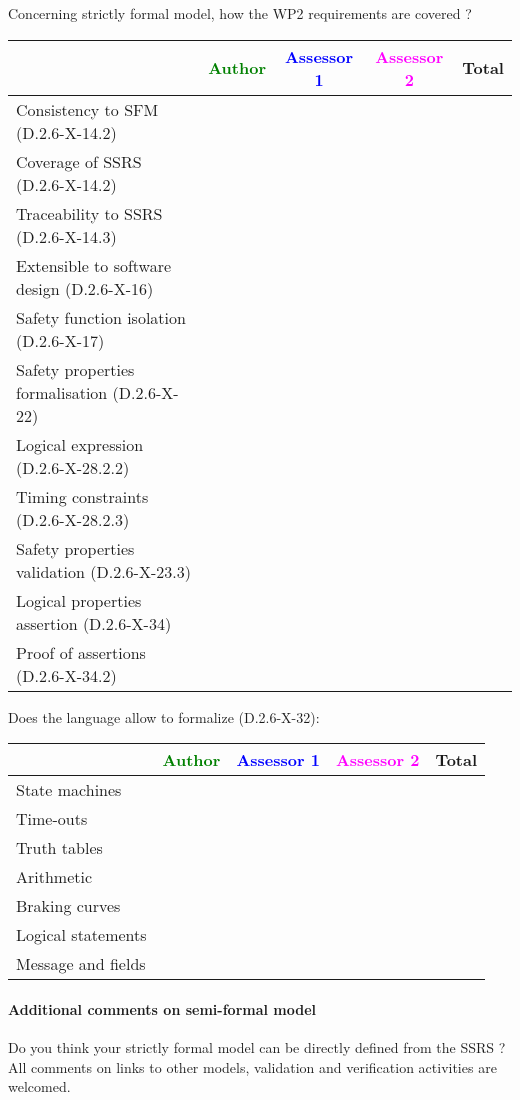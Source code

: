 Concerning strictly formal model, how the WP2 requirements are covered ?

\begin{tabular}{|l | c | c | c | c|}
\hline
& \textcolor{green}{Author} & \textcolor{blue}{Assessor 1} & \textcolor{magenta}{Assessor 2} & Total \\
\hline 
Consistency to SFM (D.2.6-X-14.2) & & & &  \\
\hline
Coverage of SSRS (D.2.6-X-14.2)  & & & &  \\
\hline
Traceability to  SSRS (D.2.6-X-14.3)  & & & &  \\
\hline
Extensible to software design (D.2.6-X-16)  & & & &  \\
\hline
Safety function isolation (D.2.6-X-17)  & & & &  \\
\hline 
Safety properties formalisation (D.2.6-X-22)  & & & &  \\
\hline
Logical expression (D.2.6-X-28.2.2)  & & & &  \\
\hline
Timing constraints (D.2.6-X-28.2.3)  & & & &  \\
\hline
Safety properties validation (D.2.6-X-23.3)  & & & &  \\
\hline
Logical properties assertion (D.2.6-X-34)  & & & &  \\
\hline
Proof of assertions (D.2.6-X-34.2)  & & & &  \\
\hline
\end{tabular}

Does the language allow to  formalize (D.2.6-X-32):

\begin{tabular}{|l | c | c | c | c|}
\hline
& \textcolor{green}{Author} & \textcolor{blue}{Assessor 1} & \textcolor{magenta}{Assessor 2} & Total \\
\hline 
State machines  & & & &  \\
\hline
Time-outs  & & & &  \\
\hline
Truth tables  & & & &  \\
\hline
Arithmetic  & & & &  \\
\hline
Braking curves  & & & &  \\
\hline
Logical statements & & & &  \\
\hline
Message and fields & & & &  \\
\hline
\end{tabular}

\paragraph{Additional comments on semi-formal  model} Do you think your strictly formal  model can be directly defined from the SSRS ?
All comments on links to  other models, validation and verification activities are welcomed.


